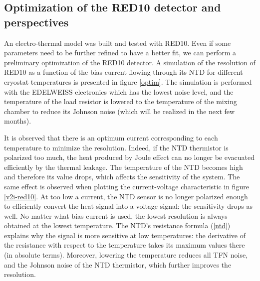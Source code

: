 \subsection{Optimization of the RED10 detector and perspectives}

An electro-thermal model was built and tested with RED10. Even if some parameters need to be further refined to have a better fit, we can perform a preliminary optimization of the RED10 detector. A simulation of the resolution of RED10 as a function of the bias current flowing through its NTD for different cryostat temperatures is presented in figure \ref{optim}. The simulation is performed with the EDELWEISS electronics which has the lowest noise level, and the temperature of the load resistor is lowered to the temperature of the mixing chamber to reduce its Johnson noise (which will be realized in the next few months).

It is observed that there is an optimum current corresponding to each temperature to minimize the resolution. Indeed, if the NTD thermistor is polarized too much, the heat produced by Joule effect can no longer be evacuated efficiently by the thermal leakage. The temperature of the NTD becomes high and therefore its value drops, which affects the sensitivity of the system. The same effect is observed when plotting the current-voltage characteristic in figure \ref{v2i-red10}. At too low a current, the NTD sensor is no longer polarized enough to efficiently convert the heat signal into a voltage signal: the sensitivity drops as well. No matter what bias current is used, the lowest resolution is always obtained at the lowest temperature. The NTD's resistance formula (\ref{ntd}) explains why the signal is more sensitive at low temperatures: the derivative of the resistance with respect to the temperature takes its maximum values there (in absolute terms). Moreover, lowering the temperature reduces all TFN noise, and the Johnson noise of the NTD thermistor, which further improves the resolution.

